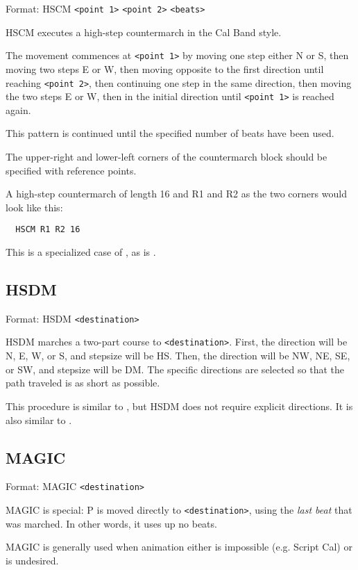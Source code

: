 Format: HSCM \verb$<point 1>$ \verb$<point 2>$ \verb$<beats>$

HSCM executes a high-step countermarch in the Cal Band style.

The movement commences at \verb$<point 1>$ by moving one step either N or S,
then moving two steps E or W, then moving opposite to the first direction
until reaching \verb$<point 2>$, then continuing one step in the same
direction, then moving the two steps E or W, then in the initial direction
until \verb$<point 1>$ is reached again.

This pattern is continued until the specified number of beats have been used.

The upper-right and lower-left corners of the countermarch block should be
specified with reference points.

A high-step countermarch of length 16 and R1 and R2 as the two corners would
look like this:
\begin{verbatim}
  HSCM R1 R2 16
\end{verbatim}

This is a specialized case of , as is
.

\subsection{HSDM}\label{hsdm}

Format: HSDM \verb$<destination>$

HSDM marches a two-part course to \verb$<destination>$.  First, the
direction will be N, E, W, or S, and stepsize will be HS.  Then, the
direction will be NW, NE, SE, or SW, and stepsize will be DM.  The
specific directions are selected so that the path traveled is as short
as possible.

This procedure is similar to , but HSDM does
not require explicit directions.  It is also similar to .


\subsection{MAGIC}\label{magic}

Format: MAGIC \verb$<destination>$

MAGIC is special: P is moved directly to \verb$<destination>$, using the
{\it last beat} that was marched.  In other words, it uses up no beats.

MAGIC is generally used when animation either is impossible (e.g. Script
Cal) or is undesired.

